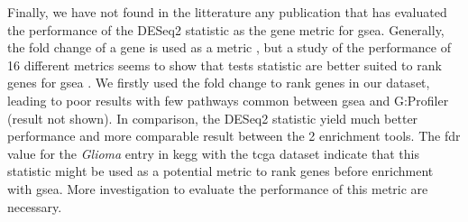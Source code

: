 Finally, we have not found in the litterature any publication that has evaluated the performance of the DESeq2 statistic as the gene metric for \acrshort{gsea}.
Generally, the fold change of a gene is used as a metric \cite*{Reimand2019}, but a study of the performance of 16 different metrics seems to show that tests statistic are better suited to rank genes for \acrshort{gsea} \cite*{Zyla2017}.
We firstly used the fold change to rank genes in our dataset, leading to poor results with few pathways common between \acrshort{gsea} and G:Profiler (result not shown).
In comparison, the DESeq2 statistic yield much better performance and more comparable result between the 2 enrichment tools.
The \acrshort{fdr} value for the \textit{Glioma} entry in \acrshort{kegg} with the \acrshort{tcga} dataset indicate that this statistic might be used as a potential metric to rank genes before enrichment with \acrshort{gsea}.
More investigation to evaluate the performance of this metric are necessary.
